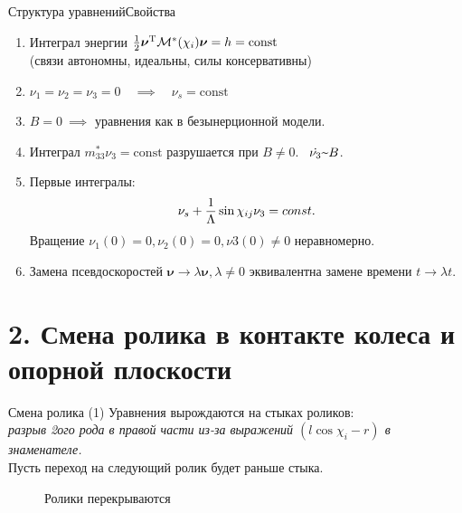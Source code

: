 \documentclass{beamer}
\newcommand{\textprop}{\raisebox{0.5ex}{\texttildelow}}
\renewcommand{\vec}[1]{\boldsymbol{\mathbf{#1}}}
\begin{document}
\begin{frame}{Структура уравнений}{Свойства}    
\begin{enumerate}
    \item Интеграл энергии \quad $\frac{1}{2}\vec{\nu}^\mathrm{T}\M^*(\chi_i)\vec{\nu} = h = \mathrm{const}$\\
    (связи автономны, идеальны, силы консервативны)
    \item $\nu_1 = \nu_2 = \nu_3 = 0 \quad \implies \quad \nu_s = \mathrm{const}$
    \item $B = 0 \ \implies$ уравнения как в безынерционной модели.
    \item Интеграл $m_{33}^*\nu_3 = \mathrm{const}$ разрушается при $B \neq 0$. \ $\dot{\nu_3} \textprop B$.
    \item Первые интегралы:
    $$\nu_s + \displaystyle\frac{\displaystyle 1}{\displaystyle \Lambda}\sin\chi_{ij}\nu_3 = const.$$
    Вращение $\nu_1(0) = 0, \nu_2(0) = 0, \nu3(0) \neq 0$ неравномерно.
    \item Замена псевдоскоростей $\vec{\nu} \rightarrow \lambda\vec{\nu}, \lambda \neq 0$ эквивалентна замене времени $t \rightarrow \lambda t$.
\end{enumerate}
\end{frame}


\section{2. Смена ролика в контакте колеса и опорной плоскости}

\begin{frame}{Смена ролика}
    \textcolor{Periwinkle}{(1) Уравнения вырождаются на стыках роликов:}\\
    \textit{разрыв 2ого рода в правой части из-за выражений $(l\cos\chi_i-r)$ в знаменателе.} \\
    Пусть переход на следующий ролик будет раньше стыка.
    \begin{figure}
        \centering
        \caption{Ролики перекрываются}
    \end{figure}
\end{frame}
\end{document}
